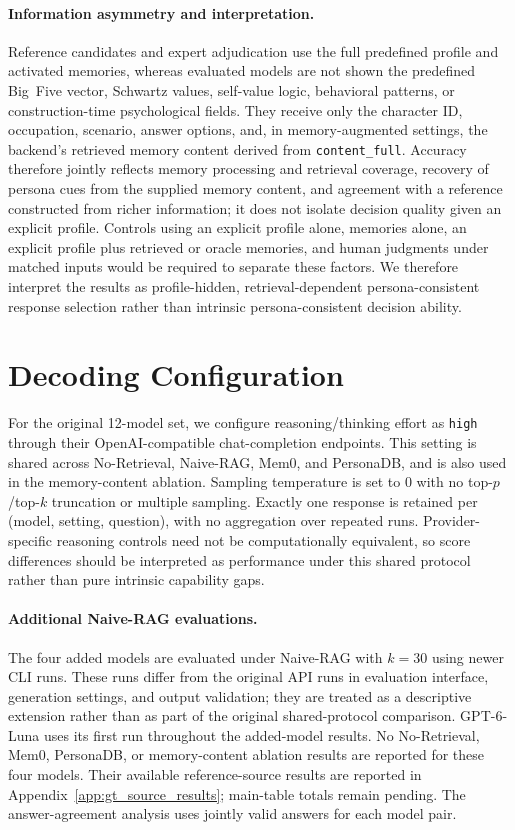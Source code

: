 \documentclass[11pt]{article}
\begin{document}
\paragraph{Information asymmetry and interpretation.}
Reference candidates and expert adjudication use the full predefined profile and activated memories, whereas evaluated models are not shown the predefined Big~Five vector, Schwartz values, self-value logic, behavioral patterns, or construction-time psychological fields. They receive only the character ID, occupation, scenario, answer options, and, in memory-augmented settings, the backend's retrieved memory content derived from \texttt{content\_full}. Accuracy therefore jointly reflects memory processing and retrieval coverage, recovery of persona cues from the supplied memory content, and agreement with a reference constructed from richer information; it does not isolate decision quality given an explicit profile. Controls using an explicit profile alone, memories alone, an explicit profile plus retrieved or oracle memories, and human judgments under matched inputs would be required to separate these factors. We therefore interpret the results as profile-hidden, retrieval-dependent persona-consistent response selection rather than intrinsic persona-consistent decision ability.

\section{Decoding Configuration}
\label{app:decoding}
For the original 12-model set, we configure reasoning/thinking effort as \texttt{high} through their OpenAI-compatible chat-completion endpoints. This setting is shared across No-Retrieval, Naive-RAG, Mem0, and PersonaDB, and is also used in the memory-content ablation. Sampling temperature is set to $0$ with no top-$p$/top-$k$ truncation or multiple sampling. Exactly one response is retained per (model, setting, question), with no aggregation over repeated runs. Provider-specific reasoning controls need not be computationally equivalent, so score differences should be interpreted as performance under this shared protocol rather than pure intrinsic capability gaps.

\paragraph{Additional Naive-RAG evaluations.}
The four added models are evaluated under Naive-RAG with $k{=}30$ using newer CLI runs. These runs differ from the original API runs in evaluation interface, generation settings, and output validation; they are treated as a descriptive extension rather than as part of the original shared-protocol comparison. GPT-6-Luna uses its first run throughout the added-model results. No No-Retrieval, Mem0, PersonaDB, or memory-content ablation results are reported for these four models. Their available reference-source results are reported in Appendix~\ref{app:gt_source_results}; main-table totals remain pending. The answer-agreement analysis uses jointly valid answers for each model pair.
\end{document}
